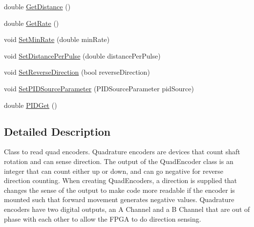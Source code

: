 \begin{DoxyCompactItemize}
double \hyperlink{classEncoder_a523cc5a0cbd52f937f2a25a14185bc22}{GetDistance} ()
\item 
double \hyperlink{classEncoder_a72423acddb85ee347fc213b8600843f7}{GetRate} ()
\item 
void \hyperlink{classEncoder_aed57d1224b55a28c666f2888102efbec}{SetMinRate} (double minRate)
\item 
void \hyperlink{classEncoder_a0bfacc84063e402077f1f620ea863ce5}{SetDistancePerPulse} (double distancePerPulse)
\item 
void \hyperlink{classEncoder_aefeeb7018f6f8ee57d824577c1c31f42}{SetReverseDirection} (bool reverseDirection)
\item 
void \hyperlink{classEncoder_a1254bae484d9ac5d794c760d097e10b9}{SetPIDSourceParameter} (PIDSourceParameter pidSource)
\item 
double \hyperlink{classEncoder_a08665d9e47c9fa77606dfe8611612e73}{PIDGet} ()
\end{DoxyCompactItemize}


\subsection{Detailed Description}
Class to read quad encoders. Quadrature encoders are devices that count shaft rotation and can sense direction. The output of the QuadEncoder class is an integer that can count either up or down, and can go negative for reverse direction counting. When creating QuadEncoders, a direction is supplied that changes the sense of the output to make code more readable if the encoder is mounted such that forward movement generates negative values. Quadrature encoders have two digital outputs, an A Channel and a B Channel that are out of phase with each other to allow the FPGA to do direction sensing. 

